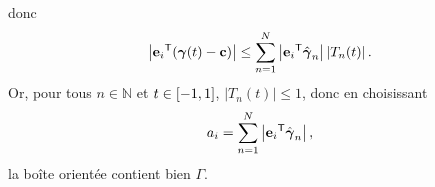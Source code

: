 donc
\begin{equation*}
	\left| {\mathbf{e}_i} ^\mathsf{T} {\left( \boldsymbol{\gamma}(t) - \mathbf{c} \right)} \right| 
	\leq \sum_{n=1}^{N} \left|{\mathbf{e}_i} ^\mathsf{T} {\hat{\boldsymbol{\gamma}}_n}\right| \left| T_n(t) \right|.
\end{equation*}
Or, pour tous $n \in \mathbb{N}$ et $t \in \left[ -1, 1 \right]$, $\left| T_n(t) \right| \leq 1$, 
donc en choisissant
\begin{equation}
	a_i = \sum_{n=1}^{N} \left|{\mathbf{e}_i} ^\mathsf{T} {\hat{\boldsymbol{\gamma}}_n}\right|,
\end{equation}
la boîte orientée contient bien $\Gamma$.


